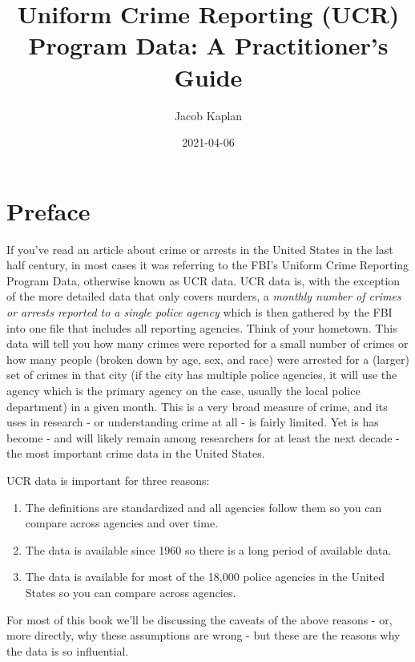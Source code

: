 \documentclass[
  12pt,
  openany]{book}
\title{Uniform Crime Reporting (UCR) Program Data: A Practitioner's Guide}
\author{Jacob Kaplan}
\date{2021-04-06}
\providecommand{\tightlist}{%
  \setlength{\itemsep}{0pt}\setlength{\parskip}{0pt}}
\begin{document}
\maketitle

{
\hypersetup{linkcolor=}
\setcounter{tocdepth}{2}
\tableofcontents
}
\hypertarget{preface}{%
\chapter{Preface}\label{preface}}

If you've read an article about crime or arrests in the United States in the last half century, in most cases it was referring to the FBI's Uniform Crime Reporting Program Data, otherwise known as UCR data. UCR data is, with the exception of the more detailed data that only covers murders, a \emph{monthly number of crimes or arrests reported to a single police agency} which is then gathered by the FBI into one file that includes all reporting agencies. Think of your hometown. This data will tell you how many crimes were reported for a small number of crimes or how many people (broken down by age, sex, and race) were arrested for a (larger) set of crimes in that city (if the city has multiple police agencies, it will use the agency which is the primary agency on the case, usually the local police department) in a given month. This is a very broad measure of crime, and its uses in research - or understanding crime at all - is fairly limited. Yet is has become - and will likely remain among researchers for at least the next decade - the most important crime data in the United States.

UCR data is important for three reasons:

\begin{enumerate}
\def\labelenumi{\arabic{enumi}.}
\tightlist
\item
  The definitions are standardized and all agencies follow them so you can compare across agencies and over time.
\item
  The data is available since 1960 so there is a long period of available data.
\item
  The data is available for most of the 18,000 police agencies in the United States so you can compare across agencies.
\end{enumerate}

For most of this book we'll be discussing the caveats of the above reasons - or, more directly, why these assumptions are wrong - but these are the reasons why the data is so influential.
\end{document}
